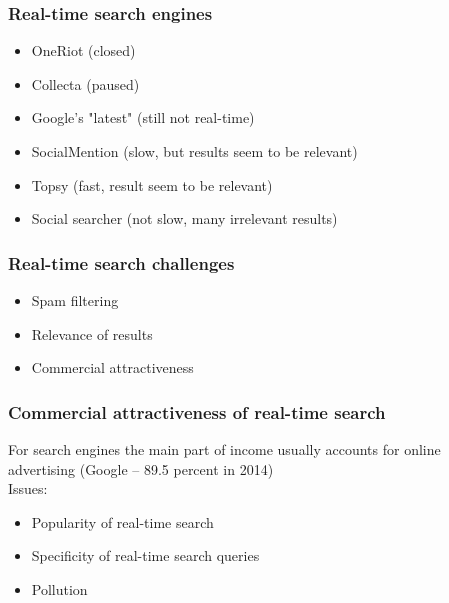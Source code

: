 \documentclass[11pt]{beamer}
\begin{document}
    
    \begin{frame}
		\frametitle{Real-time search engines}
		\begin{itemize}
			\item
				OneRiot (closed)
            \item
            	Collecta (paused)
            \item
            	Google's "latest" (still not real-time)
            \item
            	SocialMention (slow, but results seem to be relevant)
            \item
            	Topsy (fast, result seem to be relevant)
            \item
            	Social searcher (not slow, many irrelevant results)
		\end{itemize}
	\end{frame}
	
    
    \begin{frame}
		\frametitle{Real-time search challenges}
		\begin{itemize}
			\item
				Spam filtering
            \item
            	Relevance of results
            \item
            	Commercial attractiveness
		\end{itemize}
	\end{frame}
	
    
    \begin{frame}
		\frametitle{Commercial attractiveness of real-time search}
        For search engines the main part of income usually accounts for online advertising (Google – 89.5 percent in 2014)\\
Issues:
		\begin{itemize}
			\item
				Popularity of real-time search
            \item
            	Specificity of real-time search queries
            \item
            	Pollution
		\end{itemize}
	\end{frame}
	
\end{document}
